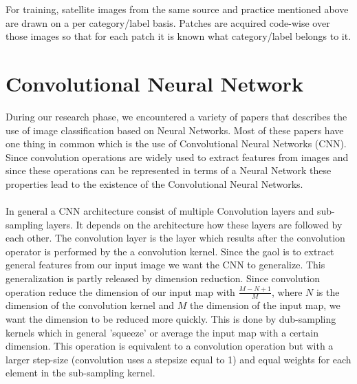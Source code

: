 \documentclass[a4paper,onecolumn]{report}
\begin{document}
For training, satellite images from the same source and practice mentioned above are drawn on a per category/label basis. Patches are acquired code-wise over those images so that for each patch it is known what category/label belongs to it.


\section{Convolutional Neural Network}
During our research phase, we encountered a variety of papers that describes the use of image classification based on Neural Networks. Most of these papers have one thing in common which is the use of Convolutional Neural Networks (CNN). Since convolution operations are widely used to extract features from images and since these operations can be represented in terms of a Neural Network these properties lead to the existence of the Convolutional Neural Networks. 
\\\\
In general a CNN architecture consist of multiple Convolution layers and sub-sampling layers. It depends on the architecture how these layers are followed by each other. The convolution layer is the layer which results after the convolution operator is performed by the a convolution kernel. Since the gaol is to extract general features from our input image we want the CNN to generalize. This generalization is partly released by dimension reduction. Since convolution operation reduce the dimension of our input map with $\frac{M-N+1}{M}$, where $N$ is the dimension of the convolution kernel and $M$ the dimension of the input map, we want the dimension to be reduced more quickly. This is done by dub-sampling kernels which in general 'squeeze' or average the input map with a certain dimension. This operation is equivalent to a convolution operation but with a larger step-size (convolution uses a stepsize equal to 1) and equal weights for each element in the sub-sampling kernel.
\end{document}
